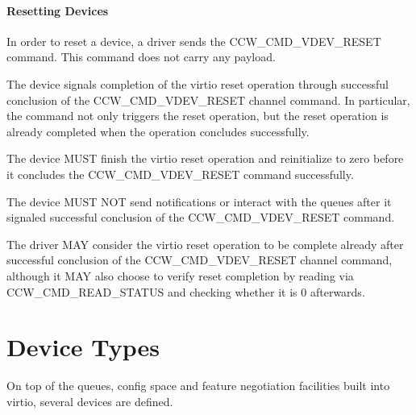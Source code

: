 \subsubsection{Resetting Devices}\label{sec:Virtio Transport Options / Virtio over channel I/O / Device Operation / Resetting Devices}

In order to reset a device, a driver sends the
CCW_CMD_VDEV_RESET command. This command does not carry any payload.

The device signals completion of the virtio reset operation through successful
conclusion of the CCW_CMD_VDEV_RESET channel command. In particular, the
command not only triggers the reset operation, but the reset operation is
already completed when the operation concludes successfully.


The device MUST finish the virtio reset operation and reinitialize
 to zero before it concludes the CCW_CMD_VDEV_RESET
command successfully.

The device MUST NOT send notifications or interact with the queues after
it signaled successful conclusion of the CCW_CMD_VDEV_RESET command.


The driver MAY consider the virtio reset operation to be complete already after
successful conclusion of the CCW_CMD_VDEV_RESET channel command, although it
MAY also choose to verify reset completion by reading  via
CCW_CMD_READ_STATUS and checking whether it is 0 afterwards.

\chapter{Device Types}\label{sec:Device Types}

On top of the queues, config space and feature negotiation facilities
built into virtio, several devices are defined.

